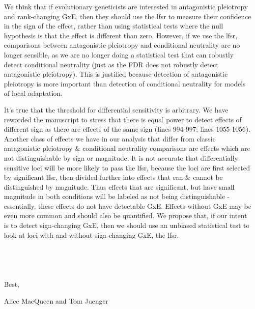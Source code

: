 \documentclass[
  letterpaper,
  DIV=11,
  numbers=noendperiod]{scrartcl}
\begin{document}
We think that if evolutionary geneticists are interested in antagonistic
pleiotropy and rank-changing GxE, then they should use the lfsr to
measure their confidence in the sign of the effect, rather than using
statistical tests where the null hypothesis is that the effect is
different than zero. However, if we use the lfsr, comparisons between
antagonistic pleiotropy and conditional neutrality are no longer
sensible, as we are no longer doing a statistical test that can robustly
detect conditional neutrality (just as the FDR does not robustly detect
antagonistic pleiotropy). This is justified because detection of
antagonistic pleiotropy is more important than detection of conditional
neutrality for models of local adaptation.

It's true that the threshold for differential sensitivity is arbitrary.
We have reworded the manuscript to stress that there is equal power to
detect effects of different sign as there are effects of the same sign
(lines 994-997; lines 1055-1056). Another class of effects we have in
our analysis that differ from classic antagonistic pleiotropy \&
conditional neutrality comparisons are effects which are not
distinguishable by sign or magnitude. It is not accurate that
differentially sensitive loci will be more likely to pass the lfsr,
because the loci are first selected by significant lfsr, then divided
further into effects that can \& cannot be distinguished by magnitude.
Thus effects that are significant, but have small magnitude in both
conditions will be labeled as not being distinguishable - essentially,
these effects do not have detectable GxE. Effects without GxE may be
even more common and should also be quantified. We propose that, if our
intent is to detect sign-changing GxE, then we should use an unbiased
statistical test to look at loci with and without sign-changing GxE, the
lfsr.

~

~

\begin{center}
Best,

\end{center}

\begin{flushright}
Alice MacQueen and Tom Juenger

\end{flushright}
\end{document}
